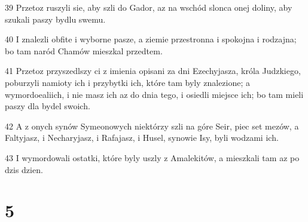 \par 39 Przetoz ruszyli sie, aby szli do Gador, az na wschód slonca onej doliny, aby szukali paszy bydlu swemu.
\par 40 I znalezli obfite i wyborne pasze, a ziemie przestronna i spokojna i rodzajna; bo tam naród Chamów mieszkal przedtem.
\par 41 Przetoz przyszedlszy ci z imienia opisani za dni Ezechyjasza, króla Judzkiego, poburzyli namioty ich i przybytki ich, które tam byly znalezione; a wymordoealiich, i nie masz ich az do dnia tego, i osiedli miejsce ich; bo tam mieli paszy dla bydel swoich.
\par 42 A z onych synów Symeonowych niektórzy szli na góre Seir, piec set mezów, a Faltyjasz, i Necharyjasz, i Rafajasz, i Husel, synowie Isy, byli wodzami ich.
\par 43 I wymordowali ostatki, które byly uszly z Amalekitów, a mieszkali tam az po dzis dzien.

\chapter{5}

